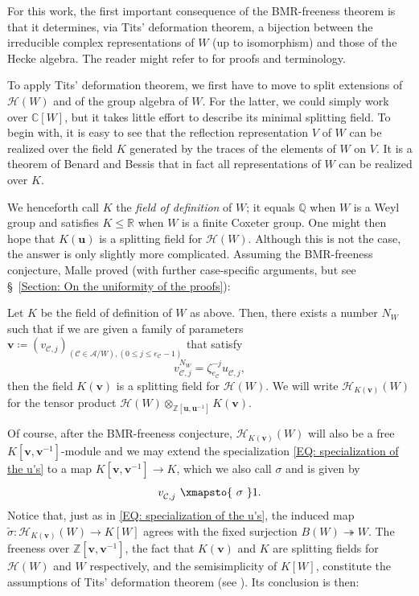 \documentclass[ALCO, Unicode]{cedram}
\newcommand{\ZZ}{\mathbb{Z}}
\newcommand{\CC}{\mathbb{C}}
\newcommand{\QQ}{\mathbb{Q}}
\begin{document}
For this work, the first important consequence of the BMR-freeness theorem is that it determines, via Tits' deformation theorem, a  bijection between the  irreducible complex representations of $W$ (up to isomorphism) and those of the Hecke algebra. The reader might refer to  \cite[\S~7]{geck-pfeiffer-book} for proofs and terminology. 

To apply Tits' deformation theorem, we first have to move to split extensions of $\mathcal{H}(W)$ and of the group algebra of $W$. For the latter, we could simply work over $\CC[W]$, but it takes little effort to describe its minimal splitting field. To begin with, it is easy to see \cite[Corol.~3.2]{bessis-corps-de-definition} that the reflection representation $V$ of $W$ can be realized over the field $K$ generated by the traces of the elements of $W$ on $V$. It is a theorem of Benard and Bessis \cite{benard-unitary,bessis-corps-de-definition} that in fact all representations of $W$ can be realized over $K$.

We henceforth call $K$ the {\it field of definition} of $W$; it equals $\QQ$ when $W$ is a Weyl group and satisfies $K\leq \mathbb{R}$ when $W$ is a finite Coxeter group. One might then hope that $K(\bm u)$ is a splitting field for $\mathcal{H}(W)$. Although this is not the case, the answer is only slightly more complicated. Assuming the BMR-freeness conjecture, Malle proved (with further case-specific arguments, but see \S~\ref{Section: On the uniformity of the proofs}):


\begin{prop}\label{Prop. Malle's charact. of splitting field L of H}
Let $K$ be the field of definition of $W$ as above. Then, there exists a number $N_W$ such that if we are given a family of parameters $\bm v\coloneqq (v_{\mathcal{C},j})_{(\mathcal{C}\in\mathcal{A}/W),(0\leq j\leq e_{\mathcal{C}}-1) }$ that satisfy $$
v_{\mathcal{C},j}^{N_W}=\zeta_{e_{\mathcal{C}}}^{-j}u^{\phantom{N_W}}_{\mathcal{C},j},$$ then the field $K(\bm v)$ is a splitting field for $\mathcal{H}(W)$. We will write  $\mathcal{H}_{K(\bm v)}(W)$ for the tensor product $\mathcal{H}(W)\otimes_{\ZZ[\bm u,\bm u^{-1}]}K(\bm v)$.
\end{prop}

Of course, after the BMR-freeness conjecture, $\mathcal{H}_{K(\bm v)}(W)$ will also be a free $K[\bm v, \bm v^{-1}]$-module and we may extend the specialization \eqref{EQ: specialization of the u's} to a map $K[\bm v, \bm v^{-1}]\rightarrow K$, which we also call $\sigma$ and is given by\begin{equation}
v^{\phantom{N_W}}_{\mathcal{C},j}\xmapsto{\displaystyle \ \sigma\ } 1. \label{EQ: Specialization v-> 1}
\end{equation} Notice that, just as in \eqref{EQ: specialization of the u's}, the induced map $\tilde{\sigma}:\mathcal{H}_{K(\bm v)}(W)\rightarrow K[W]$ agrees with the fixed surjection $B(W)\twoheadrightarrow W$. The freeness over $\ZZ[\bm v, \bm v^{-1}]$, the fact that $K(\bm v)$ and $K$ are splitting fields for $\mathcal{H}(W)$ and $W$ respectively, and the semisimplicity of $K[W]$, constitute the assumptions of Tits' deformation theorem (see \cite[\S7.3-4]{geck-pfeiffer-book}). Its conclusion is then:
\end{document}
